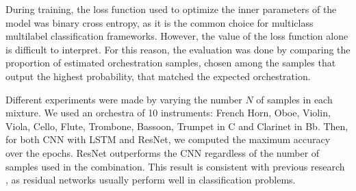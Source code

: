 \documentclass[runningheads,a4paper]{llncs}
\begin{document}
During training, the loss function used to optimize the inner parameters of the model was binary cross entropy, as it is the common choice for multiclass multilabel classification frameworks. However, the value of the loss function alone is difficult to interpret.
%
For this reason, the evaluation was done by comparing the proportion of estimated orchestration samples, chosen among the samples that output the highest probability, that matched the expected orchestration.

Different experiments were made by varying the number $N$ of samples in each mixture. We used an orchestra of 10 instruments: French Horn, Oboe, Violin, Viola, Cello, Flute, Trombone, Bassoon, Trumpet in C and Clarinet in Bb. Then, for both CNN with LSTM and ResNet, we computed the maximum accuracy over the epochs. 
ResNet outperforms the CNN regardless of the number of samples used in the combination. This result is consistent with previous research \cite{He15}, as residual networks usually perform well in classification problems.
\end{document}
